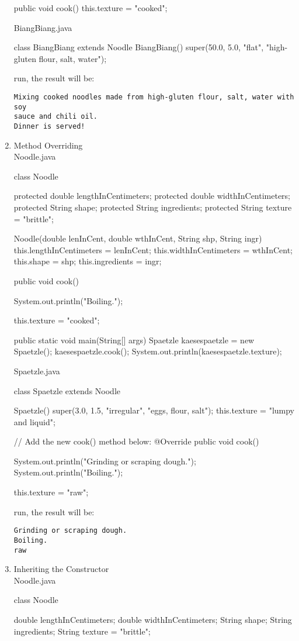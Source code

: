 \documentclass[a4paper,12pt]{article}
\begin{document}
\begin{enumerate}
\begin{javacode}
{  public void cook() {    
    this.texture = "cooked";    
  }  
}
\end{javacode}

BiangBiang.java
\begin{javacode}
class BiangBiang extends Noodle {  
  BiangBiang() {    
    super(50.0, 5.0, "flat", "high-gluten flour, salt, water");    
  }  
}
\end{javacode}
run, the result will be:
\begin{verbatim}
Mixing cooked noodles made from high-gluten flour, salt, water with soy 
sauce and chili oil.
Dinner is served!
\end{verbatim}

\item Method Overriding\\
Noodle.java
\begin{javacode}
class Noodle {  
  protected double lengthInCentimeters;
  protected double widthInCentimeters;
  protected String shape;
  protected String ingredients;
  protected String texture = "brittle";
  
  Noodle(double lenInCent, double wthInCent, String shp, String ingr) {    
    this.lengthInCentimeters = lenInCent;
    this.widthInCentimeters = wthInCent;
    this.shape = shp;
    this.ingredients = ingr;    
  }
  
  public void cook() {
    System.out.println("Boiling.");
    
    this.texture = "cooked";
  }
  
  public static void main(String[] args) {    
    Spaetzle kaesespaetzle = new Spaetzle();
    kaesespaetzle.cook();
    System.out.println(kaesespaetzle.texture);    
  }  
}
\end{javacode}
Spaetzle.java
\begin{javacode}
class Spaetzle extends Noodle {  
  Spaetzle() {    
    super(3.0, 1.5, "irregular", "eggs, flour, salt");
    this.texture = "lumpy and liquid";    
  }
  
  // Add the new cook() method below:
  @Override
  public void cook() {
    System.out.println("Grinding or scraping dough.");
    System.out.println("Boiling.");
    
    this.texture = "raw";
  }  
}
\end{javacode}
run, the result will be:
\begin{verbatim}
Grinding or scraping dough.
Boiling.
raw
\end{verbatim}

\item Inheriting the Constructor\\
Noodle.java
\begin{javacode}
class Noodle {
  double lengthInCentimeters;
  double widthInCentimeters;
  String shape;
  String ingredients;
  String texture = "brittle";
  
}
\end{javacode}
\end{enumerate}
\end{document}

